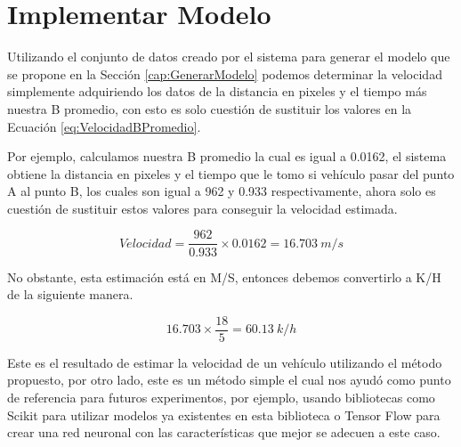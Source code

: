 \section{Implementar Modelo}

Utilizando el conjunto de datos creado por el sistema para generar el modelo que se propone en la Sección \ref{cap:GenerarModelo} podemos determinar la velocidad simplemente adquiriendo los datos de la distancia en pixeles y el tiempo más nuestra B promedio, con esto es solo cuestión de sustituir los valores en la Ecuación \ref{eq:VelocidadBPromedio}.

Por ejemplo, calculamos nuestra B promedio la cual es igual a 0.0162, el sistema obtiene la distancia en pixeles y el tiempo que le tomo si vehículo pasar del punto A al punto B, los cuales son igual a 962 y 0.933 respectivamente, ahora solo es cuestión de sustituir estos valores para conseguir la velocidad estimada.

\begin{equation}
    \label{eq:EjemploImplementacion}
    Velocidad = \frac{962 }{0.933} \times 0.0162 = 16.703 \: m/s
\end{equation}


No obstante, esta estimación está en M/S, entonces debemos convertirlo a K/H de la siguiente manera.

\begin{equation}
    \label{eq:EjmploKH}
     16.703\times \frac{18}{5} = 60.13 \: k/h
\end{equation}

Este es el resultado de estimar la velocidad de un vehículo utilizando el método propuesto, por otro lado, este es un método simple el cual nos ayudó como punto de referencia para futuros experimentos, por ejemplo, usando bibliotecas como Scikit para utilizar modelos ya existentes en esta biblioteca o Tensor Flow para crear una red neuronal con las características que mejor se adecuen a este caso.
